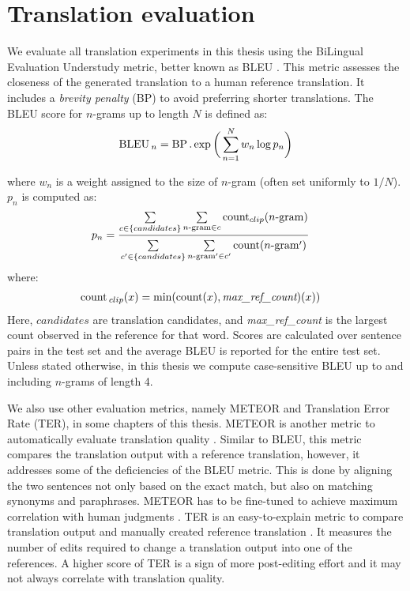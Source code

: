 \section{Translation evaluation} \label{bgexp}

We evaluate all translation experiments in this thesis using the BiLingual Evaluation Understudy metric, better known as BLEU \citep{Papineni2001}.
This metric assesses the closeness of the generated translation to a human reference translation.
It includes a \textit{brevity penalty} (BP) to avoid preferring shorter translations. 
The BLEU score for $n$-grams up to length $N$ is defined as:
%
\begin{align}
\operatorname*{BLEU} {_n} = \operatorname*{BP}. \exp \bigg( \sum_{n=1}^N w_n \log p_n \bigg)
\end{align}

\noindent 
where $w_n$ is a weight assigned to the size of $n$-gram (often set uniformly to $1/N$). $p_n$ is computed as:
%
\begin{align} 
p_n &= \frac{ \sum\limits_{{c} \in \{candidates\}} \sum\limits_{{n\!\operatorname*{-gram}} \in {c}} \operatorname*{count}_{clip}({n\!\operatorname*{-gram}}) }{  \sum\limits_{{c'} \in \{candidates\}}^{} \sum\limits_{{n\!\operatorname*{-gram} }' \in {c'}} \operatorname*{count}({n\!\operatorname*{-gram}}')  }
\end{align}
\noindent
where:
\begin{align} 
\operatorname*{count}{_{clip}}(x) &= \min(\operatorname*{count}(x), \textit{max\_ref\_count})(x)) 
\end{align}
\noindent
Here, $candidates$ are translation candidates, and \textit{max\_ref\_count} is the largest count observed in the reference for that word. 
Scores are calculated over sentence pairs in the test set and the average BLEU is reported for the entire test set.  
Unless stated otherwise, in this thesis we compute case-sensitive BLEU up to and including $n$-grams of length 4. 

We also use other evaluation metrics, namely METEOR and Translation Error Rate (TER), in some chapters of this thesis.
METEOR is another metric to automatically evaluate translation quality \citep{banerjee-lavie-2005-meteor,denkowski-lavie-2011-meteor,denkowski:lavie:meteor-wmt:2014}.
Similar to BLEU, this metric compares the translation output with a reference translation, however, it addresses some of the deficiencies of the BLEU metric.
This is done by aligning the two sentences not only based on the exact match, but also on matching synonyms and paraphrases. 
METEOR has to be fine-tuned to achieve maximum correlation with human judgments \citep{agarwal-lavie-2008-meteor}.
TER is an easy-to-explain metric to compare translation output and manually created reference translation \citep{Snover06astudy}. 
It measures the number of edits required to change a translation output into one of the references.
A higher score of TER is a sign of more post-editing effort and it may not always correlate with translation quality.

